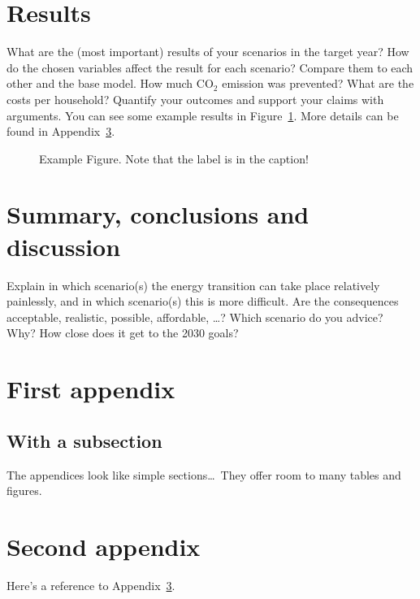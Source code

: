 \documentclass[11pt]{article}  %
\begin{document}
\section{Results}
\label{sec:results}

What are the (most important) results of your scenarios in the target year?
How do the chosen variables affect the result for each scenario?  Compare them to each other and the
base model. How much CO$_2$ emission was prevented? What are the costs per household?  Quantify your
outcomes and support your claims with arguments.  You can see some example results in Figure~\ref{fig:SRES}.
More details can be found in Appendix~\ref{app:firstApp}.

\begin{figure}
  \centering
  \caption{Example Figure.  Note that the label is in the caption!
    \label{fig:SRES}
  }
\end{figure}


\section{Summary, conclusions and discussion}
\label{sec:conclusions}

Explain in which scenario(s) the energy transition can take place relatively painlessly, and in which
scenario(s) this is more difficult. Are the consequences acceptable, realistic, possible, affordable, \ldots?
Which scenario do you advice? Why?  How close does it get to the 2030 goals?


\begin{appendices}  %
  \section{First appendix}
  \label{app:firstApp}
  
  \subsection*{With a subsection}
  
  The appendices look like simple sections\ldots\
  They offer room to many tables and figures.
  
  
  \section{Second appendix}
  Here's a reference to Appendix~\ref{app:firstApp}.
  
\end{appendices}
\end{document}
